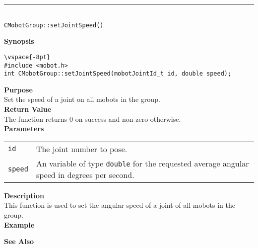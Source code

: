 \noindent
\vspace{5pt}
\rule{4.5in}{0.015in}\\
\noindent
{\LARGE \texttt{CMobotGroup::setJointSpeed()}}\\
{}

\noindent
{\bf Synopsis}
\begin{verbatim}
\vspace{-8pt}
#include <mobot.h>
int CMobotGroup::setJointSpeed(mobotJointId_t id, double speed);
\end{verbatim}

\noindent
{\bf Purpose}\\
Set the speed of a joint on all mobots in the group.\\

\noindent
{\bf Return Value}\\
The function returns 0 on success and non-zero otherwise.\\

\noindent
{\bf Parameters}
\vspace{-0.1in}
\begin{description}
\item               
\begin{tabular}{p{10 mm}p{145 mm}}
\texttt{id} & The joint number to pose. \\
\texttt{speed} & An variable of type \texttt{double} for the requested average
angular speed in degrees per second.
\end{tabular}
\end{description}

\noindent
{\bf Description}\\
This function is used to set the angular speed of a joint of all mobots in the group. 
\noindent\\
{\bf Example}\\
\noindent

\noindent
{\bf See Also}\\

